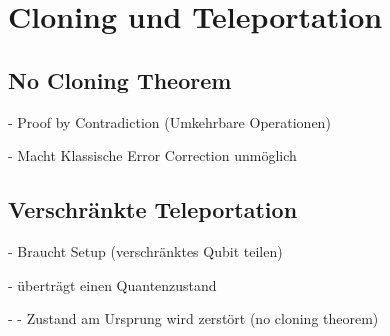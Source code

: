 \section{Cloning und Teleportation}
\subsection{No Cloning Theorem} \label{subsec:no-cloning}

- Proof by Contradiction (Umkehrbare Operationen)

- Macht Klassische Error Correction unmöglich

\subsection{Verschränkte Teleportation}

- Braucht Setup (verschränktes Qubit teilen)

- überträgt einen Quantenzustand

- - Zustand am Ursprung wird zerstört (no cloning theorem)
